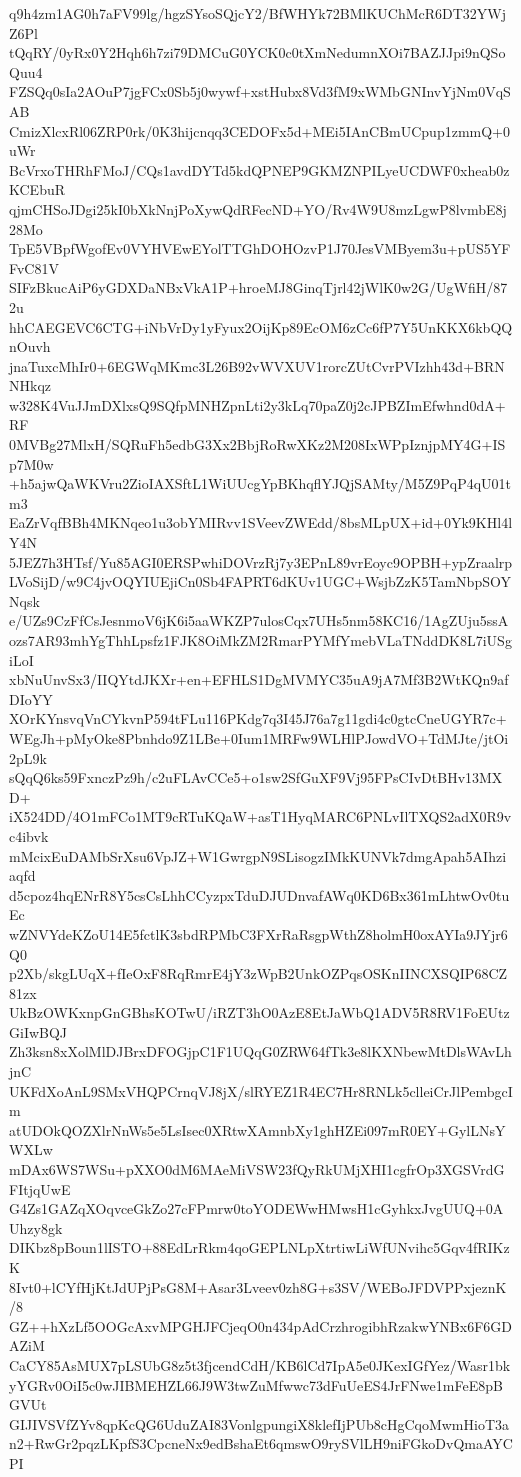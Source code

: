 q9h4zm1AG0h7aFV99lg/hgzSYsoSQjcY2/BfWHYk72BMlKUChMcR6DT32YWjZ6Pl
tQqRY/0yRx0Y2Hqh6h7zi79DMCuG0YCK0c0tXmNedumnXOi7BAZJJpi9nQSoQuu4
FZSQq0sIa2AOuP7jgFCx0Sb5j0wywf+xstHubx8Vd3fM9xWMbGNInvYjNm0VqSAB
CmizXlcxRl06ZRP0rk/0K3hijcnqq3CEDOFx5d+MEi5IAnCBmUCpup1zmmQ+0uWr
BcVrxoTHRhFMoJ/CQs1avdDYTd5kdQPNEP9GKMZNPILyeUCDWF0xheab0zKCEbuR
qjmCHSoJDgi25kI0bXkNnjPoXywQdRFecND+YO/Rv4W9U8mzLgwP8lvmbE8j28Mo
TpE5VBpfWgofEv0VYHVEwEYolTTGhDOHOzvP1J70JesVMByem3u+pUS5YFFvC81V
SIFzBkucAiP6yGDXDaNBxVkA1P+hroeMJ8GinqTjrl42jWlK0w2G/UgWfiH/872u
hhCAEGEVC6CTG+iNbVrDy1yFyux2OijKp89EcOM6zCc6fP7Y5UnKKX6kbQQnOuvh
jnaTuxcMhIr0+6EGWqMKmc3L26B92vWVXUV1rorcZUtCvrPVIzhh43d+BRNNHkqz
w328K4VuJJmDXlxsQ9SQfpMNHZpnLti2y3kLq70paZ0j2cJPBZImEfwhnd0dA+RF
0MVBg27MlxH/SQRuFh5edbG3Xx2BbjRoRwXKz2M208IxWPpIznjpMY4G+ISp7M0w
+h5ajwQaWKVru2ZioIAXSftL1WiUUcgYpBKhqflYJQjSAMty/M5Z9PqP4qU01tm3
EaZrVqfBBh4MKNqeo1u3obYMIRvv1SVeevZWEdd/8bsMLpUX+id+0Yk9KHl4lY4N
5JEZ7h3HTsf/Yu85AGI0ERSPwhiDOVrzRj7y3EPnL89vrEoyc9OPBH+ypZraalrp
LVoSijD/w9C4jvOQYIUEjiCn0Sb4FAPRT6dKUv1UGC+WsjbZzK5TamNbpSOYNqsk
e/UZs9CzFfCsJesnmoV6jK6i5aaWKZP7ulosCqx7UHs5nm58KC16/1AgZUju5ssA
ozs7AR93mhYgThhLpsfz1FJK8OiMkZM2RmarPYMfYmebVLaTNddDK8L7iUSgiLoI
xbNuUnvSx3/IIQYtdJKXr+en+EFHLS1DgMVMYC35uA9jA7Mf3B2WtKQn9afDIoYY
XOrKYnsvqVnCYkvnP594tFLu116PKdg7q3I45J76a7g11gdi4c0gtcCneUGYR7c+
WEgJh+pMyOke8Pbnhdo9Z1LBe+0Ium1MRFw9WLHlPJowdVO+TdMJte/jtOi2pL9k
sQqQ6ks59FxnczPz9h/c2uFLAvCCe5+o1sw2SfGuXF9Vj95FPsCIvDtBHv13MXD+
iX524DD/4O1mFCo1MT9cRTuKQaW+asT1HyqMARC6PNLvIlTXQS2adX0R9vc4ibvk
mMcixEuDAMbSrXsu6VpJZ+W1GwrgpN9SLisogzIMkKUNVk7dmgApah5AIhziaqfd
d5cpoz4hqENrR8Y5csCsLhhCCyzpxTduDJUDnvafAWq0KD6Bx361mLhtwOv0tuEc
wZNVYdeKZoU14E5fctlK3sbdRPMbC3FXrRaRsgpWthZ8holmH0oxAYIa9JYjr6Q0
p2Xb/skgLUqX+fIeOxF8RqRmrE4jY3zWpB2UnkOZPqsOSKnIINCXSQIP68CZ81zx
UkBzOWKxnpGnGBhsKOTwU/iRZT3hO0AzE8EtJaWbQ1ADV5R8RV1FoEUtzGiIwBQJ
Zh3ksn8xXolMlDJBrxDFOGjpC1F1UQqG0ZRW64fTk3e8lKXNbewMtDlsWAvLhjnC
UKFdXoAnL9SMxVHQPCrnqVJ8jX/slRYEZ1R4EC7Hr8RNLk5clleiCrJlPembgcIm
atUDOkQOZXlrNnWs5e5LsIsec0XRtwXAmnbXy1ghHZEi097mR0EY+GylLNsYWXLw
mDAx6WS7WSu+pXXO0dM6MAeMiVSW23fQyRkUMjXHI1cgfrOp3XGSVrdGFItjqUwE
G4Zs1GAZqXOqvceGkZo27cFPmrw0toYODEWwHMwsH1cGyhkxJvgUUQ+0AUhzy8gk
DIKbz8pBoun1lISTO+88EdLrRkm4qoGEPLNLpXtrtiwLiWfUNvihc5Gqv4fRIKzK
8Ivt0+lCYfHjKtJdUPjPsG8M+Asar3Lveev0zh8G+s3SV/WEBoJFDVPPxjeznK/8
GZ++hXzLf5OOGcAxvMPGHJFCjeqO0n434pAdCrzhrogibhRzakwYNBx6F6GDAZiM
CaCY85AsMUX7pLSUbG8z5t3fjcendCdH/KB6lCd7IpA5e0JKexIGfYez/Wasr1bk
yYGRv0OiI5c0wJIBMEHZL66J9W3twZuMfwwc73dFuUeES4JrFNwe1mFeE8pBGVUt
GIJIVSVfZYv8qpKcQG6UduZAI83VonlgpungiX8klefIjPUb8cHgCqoMwmHioT3a
n2+RwGr2pqzLKpfS3CpcneNx9edBshaEt6qmswO9rySVlLH9niFGkoDvQmaAYCPI
